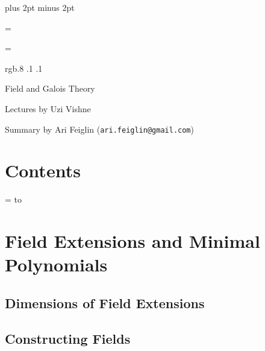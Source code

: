 

\parindent=0pt
\parskip=5pt plus 2pt minus 2pt



\footline={}


\headline={}

\color rgb{.8 .1 .1}

{\def\boxshadowcolor{rgb{.6 .4 .6}}

    \centerline{Field and Galois Theory}
    \smallskip
    \centerline{Lectures by Uzi Vishne}
    \centerline{Summary by Ari Feiglin ({\tt ari.feiglin@gmail.com})}

\eppbox

\bigskip

    \section*{Contents}
    
    \tableofcontents
\eppbox

}

\vfill\break

\color{black}

\newif\ifpageodd
\pageoddtrue
\headline={%
    \hbox to \hsize{\color{black}%
        \ifpageodd\hfil{\it\currsubsection\quad\bf\folio}\global\pageoddfalse%
        \else{\bf\folio\quad\it\currsubsection}\hfil\global\pageoddtrue\fi%
    }%
}

\vfill\break

\section{Field Extensions and Minimal Polynomials}

\subsection{Dimensions of Field Extensions}



\subsection{Constructing Fields}


